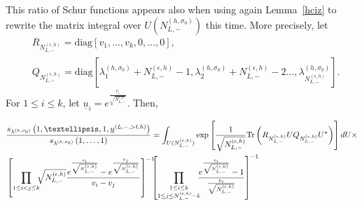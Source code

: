 \documentclass[11pt]{amsart}
\theoremstyle{plain}
\theoremstyle{definition}
\theoremstyle{remark}
\newcommand\si{\sigma}
\numberwithin{equation}{section}
\numberwithin{theorem}{section}
\numberwithin{figure}{section}
\begin{document}
This ratio of Schur functions
appears also when using again Lemma~\ref{hciz} to rewrite the matrix
integral over $U(N_{L,-}^{(h,\si_0)})$ this time.
More precisely, let
\begin{align*}
&R_{N_{L,-}^{(\epsilon,h)}}=\mathrm{diag}\left[v_1,\dotsc,v_k,0,\dotsc,0\right],
\\
&Q_{N_{L,-}^{(\epsilon,h)}}=\mathrm{diag}\left[\lambda^{(h,\si_0)}_1+N_{L,-}^{(\epsilon,h)}-1,\lambda^{(h,\si_0)}_2+N_{L,-}^{(\epsilon,h)}-2\ldots,\lambda^{(h,\si_0)}_{N_{L,-}^{(\epsilon,h)}}\right].
\end{align*}
For $1\leq i\leq k$, let $\underline{u}_i=e^{\frac{v_i}{\sqrt{N_{L,-}^{\epsilon,h}}}}$.
Then,
\begin{small}
\begin{align}
  \label{lg2b}
&\frac{%
s_{\lambda^{(h,\si_0)}}\left(1,\ldots,1,\underline{u}^{(L,-,>t,h)}\right)
}{%
s_{\lambda^{(h,\si_0)}}\left(1,\dotsc,1\right)}
=
\int_{U(N_{L,-}^{(\epsilon,h)})}\exp\left[\frac{1}{\sqrt{N_{L,-}^{(\epsilon,h)}}} \mathrm{Tr}\left(R_{N_{L,-}^{(\epsilon,h)}} U Q_{N_{L,-}^{(\epsilon,h)}} U^*\right)\right]dU \times\\
&\left[\prod_{1\leq i<j\leq k}\!\!\!
\sqrt{N_{L,-}^{(\epsilon,h)}}\frac{e^{\frac{v_i}{\sqrt{N_{L,-}^{(\epsilon,h)}}}}-e^{\frac{v_j}{\sqrt{N_{L,-}^{(\epsilon,h)}}}}}{v_i-v_j}\right]^{-1}\!\!\!
\left[\prod_{\substack{{1\leq i\leq k}\\{1\leq j\leq N_{L,-}^{(\epsilon,h)}-k}}}\!\!\!
  \frac{e^{\frac{v_i}{\sqrt{N_{L,-}^{(\epsilon,h)}}}}-1}{\frac{v_i}{\sqrt{N_{L,-}^{(\epsilon,h)}}}}\right]^{-1}\!\!\!\notag
\end{align}
\end{small}
\end{document}
